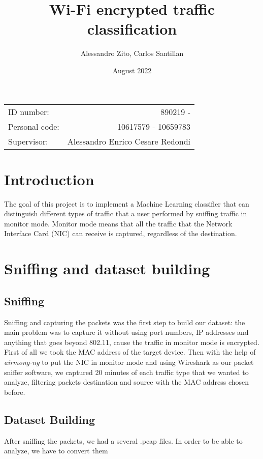 \documentclass[11pt, USenglish]{article}
\title{Wi-Fi encrypted traffic classification}
\author{Alessandro Zito, Carlos Santillan}
\date{August 2022}
\begin{document}
\maketitle
\begin{center}
\begin{tabular}{l r}
ID number: & 890219 - \\ %
Personal code: & 10617579 - 10659783\\
Supervisor: & Alessandro Enrico Cesare Redondi %
\end{tabular}
\end{center}


\newpage

\tableofcontents

\newpage


\section{Introduction}
The goal of this project is to implement a Machine Learning classifier that can distinguish different types of traffic that a user performed by sniffing traffic in monitor mode. Monitor mode means that all the traffic that the Network Interface Card (NIC) can receive is captured, regardless of the destination. 

\section{Sniffing and dataset building}

\subsection{Sniffing}
Sniffing and capturing the packets was the first step to build our dataset: the main problem was to capture it without using port numbers, IP addresses and anything that goes beyond 802.11, cause the traffic in monitor mode is encrypted.
First of all we took the MAC address of the target device. Then with the help of \textit{airmong-ng} \cite{airmonng} to put the NIC in monitor mode and using Wireshark as our packet sniffer software, we captured 20 minutes of each traffic type that we wanted to analyze, filtering packets destination and source with the MAC address chosen before.

\subsection{Dataset Building}
After sniffing the packets, we had a several .pcap files. In order to be able to analyze, we have to convert them 
\end{document}
